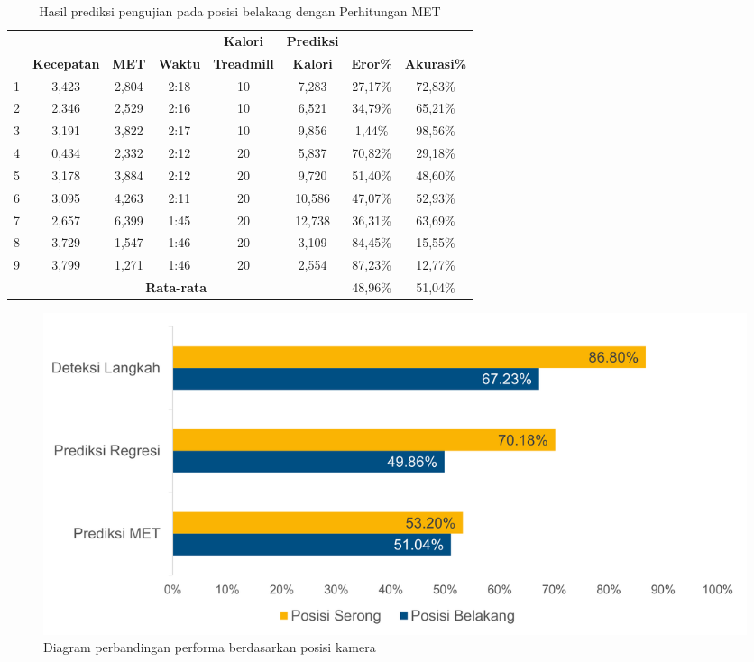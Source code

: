 \begin{longtable}{|c|c|c|c|c|c|c|c|}
  \caption{Hasil prediksi pengujian pada posisi belakang dengan Perhitungan MET}
  \label{tb:PengujianPosisiBelakangAnalisaPrediksiPerhitungan}                                   \\
  \hline
  \rowcolor[HTML]{C0C0C0}
  & & & & \textbf{Kalori} & \textbf{Prediksi} & & \\
  \rowcolor[HTML]{C0C0C0}
  \multirow{-2}{*}{\textbf{Percobaan}} & \multirow{-2}{*}{\textbf{Kecepatan}} & \multirow{-2}{*}{\textbf{MET}} & \multirow{-2}{*}{\textbf{Waktu}} & \textbf{Treadmill} & \textbf{Kalori} & \multirow{-2}{*}{\textbf{Eror\%}} & \multirow{-2}{*}{\textbf{Akurasi\%}} \\
  \hline
  1   & 3,423   & 2,804    & 2:18    & 10   & 7,283    & 27,17\%      & 72,83\%   \\
  \hline
  2   & 2,346   & 2,529    & 2:16    & 10   & 6,521    & 34,79\%      & 65,21\%   \\
  \hline
  3   & 3,191   & 3,822    & 2:17    & 10   & 9,856    & 1,44\%       & 98,56\%   \\
  \hline
  4   & 0,434   & 2,332    & 2:12    & 20   & 5,837    & 70,82\%      & 29,18\%   \\
  \hline
  5   & 3,178   & 3,884    & 2:12    & 20   & 9,720    & 51,40\%      & 48,60\%   \\
  \hline
  6   & 3,095   & 4,263    & 2:11    & 20   & 10,586   & 47,07\%      & 52,93\%   \\
  \hline
  7   & 2,657   & 6,399    & 1:45    & 20   & 12,738   & 36,31\%      & 63,69\%   \\
  \hline
  8   & 3,729   & 1,547    & 1:46    & 20   & 3,109    & 84,45\%      & 15,55\%   \\
  \hline
  9   & 3,799   & 1,271    & 1:46    & 20   & 2,554    & 87,23\%      & 12,77\%   \\
  \hline

  \multicolumn{6}{|c|}{\textbf{Rata-rata}} & 48,96\% & 51,04\%  \\
  \hline
\end{longtable}

\begin{figure}[H]
  \centering
  \includegraphics[scale=0.7]{gambar/diagram_posisi.png}
  \caption{Diagram perbandingan performa berdasarkan posisi kamera}
  \label{fig:DiagramPosisi}
\end{figure}


